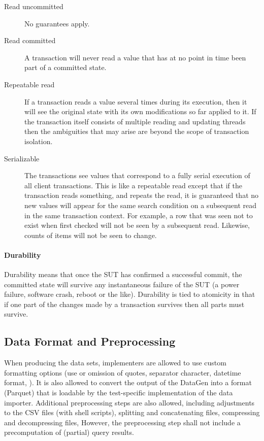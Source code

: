 \begin{description}
\item[Read uncommitted] No guarantees apply.
\item[Read committed] A transaction will never read a value that has at no point in time been part of a
    committed state.
\item[Repeatable read] If a transaction reads a value several times during its execution, then it will see
    the original state with its own modifications so far applied to it. If the transaction itself consists of
    multiple reading and updating threads then the ambiguities that may arise are beyond the scope of transaction isolation.
\item[Serializable] The transactions see values that correspond to a fully serial execution of
    all client transactions. This is like a repeatable read except that if the transaction reads something, and
    repeats the read, it is guaranteed that no new values will appear for the same search condition on a
    subsequent read in the same transaction context. For example, a row that was seen not to exist when
    first checked will not be seen by a subsequent read. Likewise, counts of items will not be seen to
    change.
\end{description}

\paragraph{Durability}
Durability means that once the SUT has confirmed a successful commit, the committed state
will survive any instantaneous failure of the SUT (\eg a power failure, software crash, reboot or
the like). Durability is tied to atomicity in that if one part of the changes made by a transaction survives then
all parts must survive. %


\subsection{Data Format and Preprocessing}
\label{sec:auditing-data-format}

When producing the data sets, implementers are allowed to use custom formatting options (\eg use or omission of quotes, separator character, datetime format, \etc).
It is also allowed to convert the output of the DataGen into a format (\eg Parquet) that is loadable by the test-specific implementation of the data importer.
Additional preprocessing steps are also allowed, including adjustments to the CSV files (\eg with shell scripts), splitting and concatenating files, compressing and decompressing files, \etc
However, the preprocessing step shall not include a precomputation of (partial) query results.


